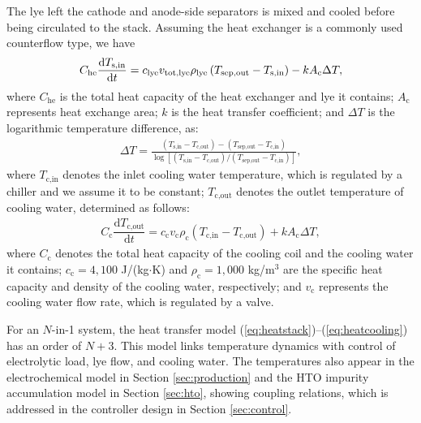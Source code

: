 \documentclass[review,3p,10pt]{elsarticle}
\begin{document}
The lye left the cathode and anode-side separators is mixed and cooled before being circulated to the stack. Assuming the heat exchanger is a commonly used counterflow type, we have %
\begin{align}
  C_{\text{he}} \dfrac{{\text{d}}T_{\text{s,in}}}{\text{d}t} = c_{\text{lye}} v_{\text{tot,lye}} \rho_{\rm{lye}} \left( T_{\text{sep,out}} - T_{\text{s,in}} \right) - k A_\text{c} \Delta T  , \label{eq:heatexchange}
\end{align}
where $C_{\text{he}}$ is the total heat capacity of the heat exchanger and lye it contains; %
$A_\text{c}$ represents heat exchange area; $k$ is the heat transfer coefficient; and $\Delta T$  is the logarithmic temperature difference, as:
\begin{align}
  \Delta T = \frac{ \left( T_{\text{s,in}} - T_{\text{c,out}} \right) - \left( T_{\text{sep,out}} - T_{\text{c,in}} \right) }{\log \left[ \left( T_{\text{s,in}} - T_{\text{c,out}} \right) / \left( T_{\text{sep,out}} - T_{\text{c,in}} \right) \right]},
\end{align}
where $T_{\text{c,in}}$ denotes the inlet cooling water temperature, which is regulated by a chiller and we assume it to be constant; $T_{\text{c,out}}$ denotes the outlet temperature of cooling water, determined as follows:
\begin{align}
  C_{\text{c}} \dfrac{{\text{d}}T_{\text{c,out}}}{\text{d}t} = c_{\text{c}} v_{\text{c}} \rho_{\text{c}} \left( T_{\text{c,in}} - T_{\text{c,out}} \right) + k A_\text{c} \Delta T  , \label{eq:heatcooling}
\end{align}
where $C_{\text{c}}$ denotes the total heat capacity of the cooling coil and the cooling water it contains; %
$c_{\text{c}}=4,100$ J/(kg$\cdot$K) and $\rho_{\text{c}} = 1,000$ kg/m$^3$ are the specific heat capacity and density of the cooling water, respectively; and $v_{\text{c}}$ represents the cooling water flow rate, which is regulated by a valve.

For an $N$-in-1 system, the heat transfer model (\ref{eq:heatstack})--(\ref{eq:heatcooling}) has an order of $N+3$. %
This model links temperature dynamics with control of electrolytic load, lye flow, and cooling water.
The temperatures also appear in the electrochemical model in Section \ref{sec:production} and the HTO impurity accumulation model in Section \ref{sec:hto}, %
showing coupling relations, which is addressed in the controller design in Section \ref{sec:control}. %
\end{document}

